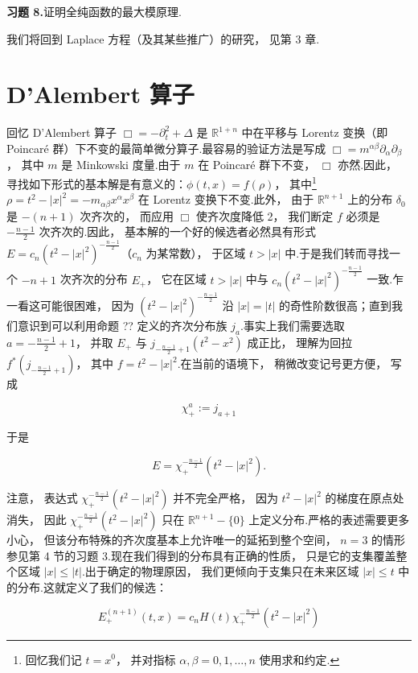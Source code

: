 \noindent\textbf{习题 8.}\quad 证明全纯函数的最大模原理.

我们将回到 Laplace 方程（及其某些推广）的研究， 见第 3 章.
\section{D'Alembert 算子}

回忆 D'Alembert 算子 $\Box = -\partial_{t}^{2} + \Delta$ 是 $\mathbb{R}^{1+n}$ 中在平移与 Lorentz 变换（即 Poincaré 群）下不变的最简单微分算子.最容易的验证方法是写成 $\Box = m^{\alpha\beta}\partial_{\alpha}\partial_{\beta}$， 其中 $m$ 是 Minkowski 度量.由于 $m$ 在 Poincaré 群下不变， $\Box$ 亦然.因此， 寻找如下形式的基本解是有意义的：$\phi(t, x) = f(\rho)$， 其中\footnote{回忆我们记 $t = x^{0}$， 并对指标 $\alpha, \beta = 0, 1, \ldots, n$ 使用求和约定.} $\rho = t^{2} - |x|^{2} = -m_{\alpha\beta}x^{\alpha}x^{\beta}$ 在 Lorentz 变换下不变.此外， 由于 $\mathbb{R}^{n+1}$ 上的分布 $\delta_{0}$ 是 $-(n+1)$ 次齐次的， 而应用 $\Box$ 使齐次度降低 2， 我们断定 $f$ 必须是 $-\frac{n-1}{2}$ 次齐次的.因此， 基本解的一个好的候选者必然具有形式 $E = c_{n}(t^{2}-|x|^{2})^{-\frac{n-1}{2}}$（$c_{n}$ 为某常数）， 于区域 $t > |x|$ 中.于是我们转而寻找一个 $-n+1$ 次齐次的分布 $E_{+}$， 它在区域 $t > |x|$ 中与 $c_{n}(t^{2}-|x|^{2})^{-\frac{n-1}{2}}$ 一致.乍一看这可能很困难， 因为 $(t^{2}-|x|^{2})^{-\frac{n-1}{2}}$ 沿 $|x| = |t|$ 的奇性阶数很高；直到我们意识到可以利用命题 ?? 定义的齐次分布族 $j_{a}$.事实上我们需要选取 $a = -\frac{n-1}{2} + 1$， 并取 $E_{+}$ 与 $j_{-\frac{n-1}{2}+1}(t^{2}-x^{2})$ 成正比， 理解为回拉 $f^{*}(j_{-\frac{n-1}{2}+1})$， 其中 $f = t^{2}-|x|^{2}$.在当前的语境下， 稍微改变记号更方便， 写成

\[
\chi_{+}^{a} := j_{a+1}
\]

于是

\[
E = \chi_{+}^{-\frac{n-1}{2}}(t^{2}-|x|^{2}).
\]

注意， 表达式 $\chi_{+}^{-\frac{n-1}{2}}(t^{2}-|x|^{2})$ 并不完全严格， 因为 $t^{2}-|x|^{2}$ 的梯度在原点处消失， 因此 $\chi_{+}^{-\frac{n-1}{2}}(t^{2}-|x|^{2})$ 只在 $\mathbb{R}^{n+1}-\{0\}$ 上定义分布.严格的表述需要更多小心， 但该分布特殊的齐次度基本上允许唯一的延拓到整个空间， $n = 3$ 的情形参见第 4 节的习题 3.现在我们得到的分布具有正确的性质， 只是它的支集覆盖整个区域 $|x| \leq |t|$.出于确定的物理原因， 我们更倾向于支集只在未来区域 $|x| \leq t$ 中的分布.这就定义了我们的候选：

\[
E_{+}^{(n+1)}(t, x) = c_{n}H(t)\chi_{+}^{-\frac{n-1}{2}}(t^{2}-|x|^{2})
\]

